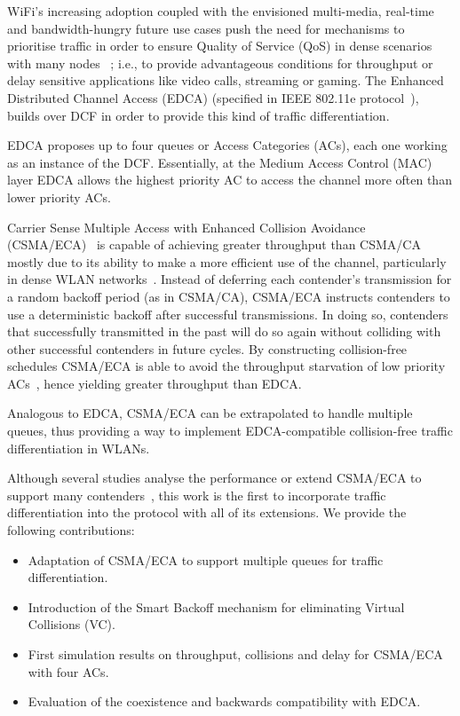 \documentclass[a4paper]{article}
\begin{document}
WiFi's increasing adoption coupled with the envisioned multi-media, real-time and bandwidth-hungry future use cases push the need for mechanisms to prioritise traffic in order to ensure Quality of Service (QoS) in dense scenarios with many nodes~\cite{HEW-scenarios,bellalta2015WCM} ; i.e., to provide advantageous conditions for throughput or delay sensitive applications like video calls, streaming or gaming. The Enhanced Distributed Channel Access (EDCA) (specified in IEEE 802.11e protocol~\cite{80211e}), builds over DCF in order to provide this kind of traffic differentiation.

EDCA proposes up to four queues or Access Categories (ACs), each one working as an instance of the DCF. Essentially, at the Medium Access Control (MAC) layer EDCA allows the highest priority AC to access the channel more often than lower priority ACs.

Carrier Sense Multiple Access with Enhanced Collision Avoidance (CSMA/ECA)~\cite{sanabria2014high,research2standards} is capable of achieving greater throughput than CSMA/CA mostly due to its ability to make a more efficient use of the channel, particularly in dense WLAN networks~\cite{sanabria2014high}. Instead of deferring each contender's transmission for a random backoff period (as in CSMA/CA), CSMA/ECA instructs contenders to use a deterministic backoff after successful transmissions. In doing so, contenders that successfully transmitted in the past will do so again without colliding with other successful contenders in future cycles. By constructing collision-free schedules CSMA/ECA is able to avoid the throughput starvation of low priority ACs~\cite{990806}, hence yielding greater throughput than EDCA.

Analogous to EDCA, CSMA/ECA can be extrapolated to handle multiple queues, thus providing a way to implement EDCA-compatible collision-free traffic differentiation in WLANs. 

Although several studies analyse the performance or extend CSMA/ECA to support many contenders~\cite{bellalta2009vtc,barcelo2011tcf,ECA-DEMO-INFOCOM14,research2standards,sanabria2014high}, this work is the first to incorporate traffic differentiation into the protocol with all of its extensions. We provide the following contributions:

\begin{itemize}
	\item Adaptation of CSMA/ECA to support multiple queues for traffic differentiation.
	\item Introduction of the Smart Backoff mechanism for eliminating Virtual Collisions (VC).
	\item First simulation results on throughput, collisions and delay for CSMA/ECA with four ACs.
	\item Evaluation of the coexistence and backwards compatibility with EDCA.
\end{itemize}
\end{document}

